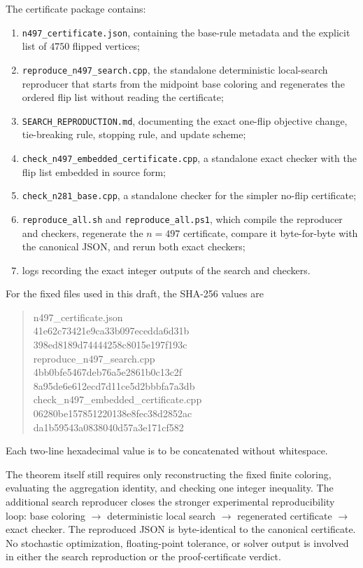 \documentclass[11pt]{article}
\newcommand{\1}{\mathbf{1}}
\begin{document}
The certificate package contains:
\begin{enumerate}[leftmargin=1.8em]
  \item \texttt{n497\_certificate.json}, containing the base-rule metadata and
  the explicit list of $4750$ flipped vertices;
  \item \texttt{reproduce\_n497\_search.cpp}, the standalone deterministic
  local-search reproducer that starts from the midpoint base coloring and
  regenerates the ordered flip list without reading the certificate;
  \item \texttt{SEARCH\_REPRODUCTION.md}, documenting the exact one-flip
  objective change, tie-breaking rule, stopping rule, and update scheme;
  \item \texttt{check\_n497\_embedded\_certificate.cpp}, a standalone exact
  checker with the flip list embedded in source form;
  \item \texttt{check\_n281\_base.cpp}, a standalone checker for the simpler
  no-flip certificate;
  \item \texttt{reproduce\_all.sh} and \texttt{reproduce\_all.ps1}, which
  compile the reproducer and checkers, regenerate the $n=497$ certificate,
  compare it byte-for-byte with the canonical JSON, and rerun both exact
  checkers;
  \item logs recording the exact integer outputs of the search and checkers.
\end{enumerate}

For the fixed files used in this draft, the SHA-256 values are
\begin{quote}\small\ttfamily
n497\_certificate.json\\
41e62c73421e9ca33b097ecedda6d31b\\
398ed8189d74444258c8015e197f193c\\[0.5ex]
reproduce\_n497\_search.cpp\\
4bb0bfe5467deb76a5e2861b0c13c2f\\
8a95de6e612ecd7d11ce5d2bbbfa7a3db\\[0.5ex]
check\_n497\_embedded\_certificate.cpp\\
06280be157851220138e8fec38d2852ac\\
da1b59543a0838040d57a3e171cf582
\end{quote}
Each two-line hexadecimal value is to be concatenated without whitespace.

The theorem itself still requires only reconstructing the fixed finite
coloring, evaluating the aggregation identity, and checking one integer
inequality.  The additional search reproducer closes the stronger experimental
reproducibility loop: base coloring $\to$ deterministic local search $\to$
regenerated certificate $\to$ exact checker.  The reproduced JSON is
byte-identical to the canonical certificate.  No stochastic optimization,
floating-point tolerance, or solver output is involved in either the search
reproduction or the proof-certificate verdict.
\end{document}
